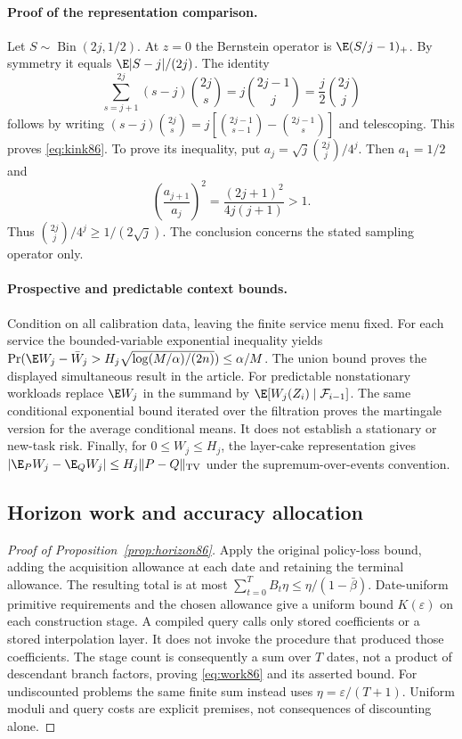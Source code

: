\paragraph{Proof of the representation comparison.}
Let $S\sim\operatorname{Bin}(2j,1/2)$. At $z=0$ the Bernstein operator is $\E(S/j-1)_+$. By symmetry it equals $\E|S-j|/(2j)$. The identity
\[
 \sum_{s=j+1}^{2j}(s-j)\binom{2j}{s}
 =j\binom{2j-1}{j}=\frac j2\binom{2j}{j}
\]
follows by writing $(s-j)\binom{2j}{s}=j[\binom{2j-1}{s-1}-\binom{2j-1}{s}]$ and telescoping. This proves \eqref{eq:kink86}. To prove its inequality, put $a_j=\sqrt j\binom{2j}{j}/4^j$. Then $a_1=1/2$ and
\[
 \left(\frac{a_{j+1}}{a_j}\right)^2
 =\frac{(2j+1)^2}{4j(j+1)}>1.
\]
Thus $\binom{2j}{j}/4^j\ge1/(2\sqrt j)$. The conclusion concerns the stated sampling operator only.

\paragraph{Prospective and predictable context bounds.}
Condition on all calibration data, leaving the finite service menu fixed. For each service the bounded-variable exponential inequality yields
$\Pr(\E W_j-\bar W_j>H_j\sqrt{\log(M/\alpha)/(2n)})\le\alpha/M$.
The union bound proves the displayed simultaneous result in the article. For predictable nonstationary workloads replace $\E W_j$ in the summand by $\E[W_j(Z_i)\mid\mathcal F_{i-1}]$. The same conditional exponential bound iterated over the filtration proves the martingale version for the average conditional means. It does not establish a stationary or new-task risk. Finally, for $0\le W_j\le H_j$, the layer-cake representation gives $|\E_P W_j-\E_Q W_j|\le H_j\|P-Q\|_{\rm TV}$ under the supremum-over-events convention.

\subsection{Horizon work and accuracy allocation}
\begin{proof}[Proof of Proposition~\ref{prop:horizon86}]
Apply the original policy-loss bound, adding the acquisition allowance at each date and retaining the terminal allowance. The resulting total is at most $\sum_{t=0}^TB_t\eta\le\eta/(1-\bar\beta)$. Date-uniform primitive requirements and the chosen allowance give a uniform bound $K(\varepsilon)$ on each construction stage. A compiled query calls only stored coefficients or a stored interpolation layer. It does not invoke the procedure that produced those coefficients. The stage count is consequently a sum over $T$ dates, not a product of descendant branch factors, proving \eqref{eq:work86} and its asserted bound. For undiscounted problems the same finite sum instead uses $\eta=\varepsilon/(T+1)$. Uniform moduli and query costs are explicit premises, not consequences of discounting alone.
\end{proof}

